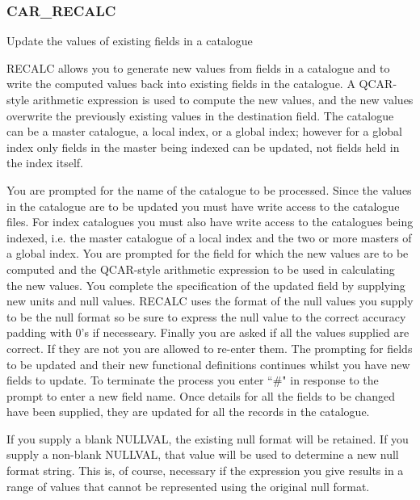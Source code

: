 \subsubsection{CAR\_RECALC}
 
Update the values of existing fields in a catalogue

RECALC allows you to generate new values from fields in a catalogue 
and to write the computed values back into existing fields in the 
catalogue. 
A QCAR-style arithmetic expression is used to compute the new values, and 
the new values overwrite the previously existing values in the destination 
field.  
The catalogue can be a master catalogue, a local index, or a global index; 
however for a global index only fields in the master being indexed can be
updated, not fields held in the index itself.

You are prompted for the name of the catalogue to be processed. 
Since the values in the catalogue are to be updated you must have write 
access to the catalogue files.
For index catalogues you must also have write access to the catalogues 
being indexed, i.e. the master catalogue of a local index and the two or more 
masters of a global index.
You are prompted for the field for which the new values are to be 
computed and the QCAR-style arithmetic expression to be used in calculating 
the new values.
You complete the specification of the updated field by supplying new 
units and null values. RECALC uses the format of the null values you supply
to be the null format so be sure to express the null value to the correct 
accuracy padding with 0's if necesseary. 
Finally you are asked if all the values supplied are correct. 
If they are not you are allowed to re-enter them.
The prompting for fields to be updated and their new functional definitions 
continues whilst you have new fields to update. 
To terminate the process you enter ``\#" in response to the prompt 
to enter a new field name.
Once details for all the fields to be changed have been supplied, they are 
updated for all the records in the catalogue.

If you supply a blank NULLVAL, the existing null format will be retained.  
If you supply a non-blank NULLVAL, that value will be used to determine a 
new null format string.  
This is, of course, necessary if the expression you give results in a range 
of values that cannot be represented using the original null format.

